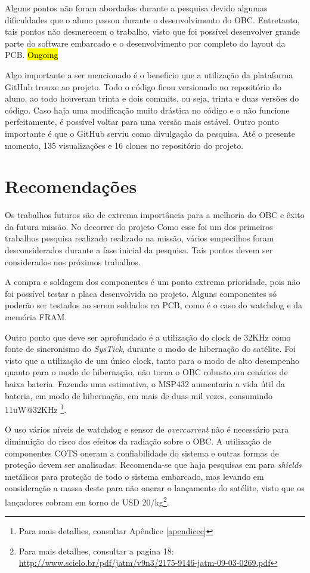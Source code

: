 Alguns pontos não foram abordados durante a pesquisa devido algumas dificuldades que o aluno passou durante o desenvolvimento do OBC. Entretanto, tais pontos não desmerecem o trabalho, visto que foi possível desenvolver grande parte do software embarcado e o desenvolvimento por completo do layout da PCB. %
\newline\hl{Ongoing}\newline

Algo importante a ser mencionado é o beneficio que a utilização da plataforma GitHub trouxe ao projeto. Todo o código ficou versionado no repositório do aluno, ao todo houveram trinta e dois commits, ou seja, trinta e duas versões do código. Caso haja uma modificação muito drástica no código e o não funcione perfeitamente, é possível voltar para uma versão mais estável. Outro ponto importante é que o GitHub serviu como divulgação da pesquisa. Até o presente momento, 135 visualizações e 16 clones no repositório do projeto.  


\section{Recomendações}
\label{Recomendações}
Os trabalhos futuros são de extrema importância para a melhoria do OBC e êxito da futura missão. No decorrer do projeto Como esse foi um dos primeiros trabalhos pesquisa realizado realizado na missão, vários empecilhos foram desconsiderados durante a fase inicial da pesquisa. Tais pontos devem ser considerados nos próximos trabalhos.

A compra e soldagem dos componentes é um ponto extrema prioridade, pois não foi possível testar a placa desenvolvida no projeto. Alguns componentes só poderão ser testados ao serem soldados na PCB, como é o caso do watchdog e da memória FRAM.

Outro ponto que deve ser aprofundado é a utilização do clock de 32KHz como fonte de sincronismo do \textit{SysTick}, durante o modo de hibernação do satélite. Foi visto que a utilização de um único  clock, tanto para o modo de alto desempenho quanto para o modo de hibernação, não torna o OBC robusto em cenários de baixa bateria. Fazendo uma estimativa, o MSP432 aumentaria a vida útil da bateria, em modo de hibernação, em mais de duas mil vezes, consumindo 11uW@32KHz \footnote{Para mais detalhes, consultar Apêndice \ref{apendicec}}.

O uso vários níveis de watchdog e sensor de \textit{overcurrent} não é necessário para diminuição do risco dos efeitos da radiação sobre o OBC. A utilização de componentes COTS oneram a confiabilidade do sistema e outras formas de proteção devem ser analisadas. Recomenda-se que haja pesquisas em para \textit{shields} metálicos para proteção de todo o sistema embarcado,  mas levando em consideração a massa  deste para não onerar o lançamento do satélite, visto que os lançadores cobram em torno de USD 20/kg\footnote{Para mais detalhes, consultar a pagina 18: \url{http://www.scielo.br/pdf/jatm/v9n3/2175-9146-jatm-09-03-0269.pdf}}.

